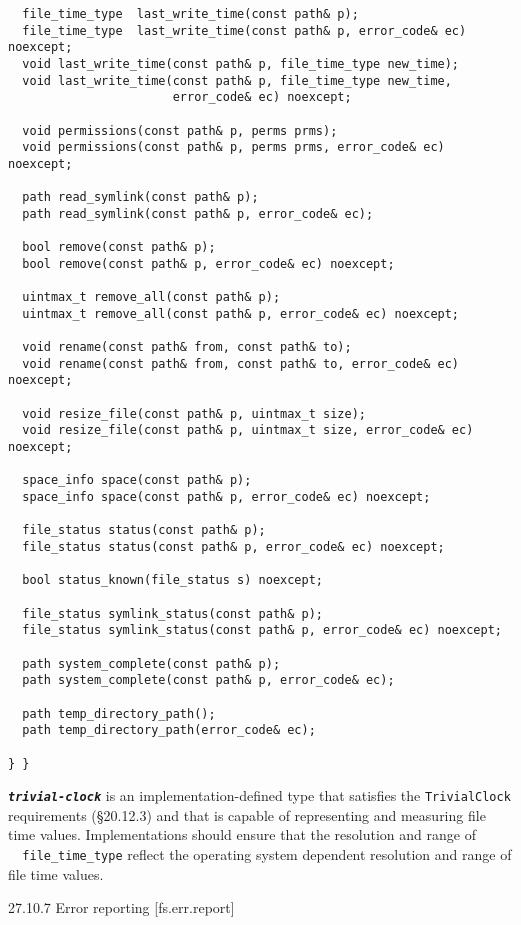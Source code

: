 \begin{verbatim}
  file_time_type  last_write_time(const path& p);
  file_time_type  last_write_time(const path& p, error_code& ec) noexcept;
  void last_write_time(const path& p, file_time_type new_time);
  void last_write_time(const path& p, file_time_type new_time,
                       error_code& ec) noexcept;
                       
  void permissions(const path& p, perms prms);
  void permissions(const path& p, perms prms, error_code& ec) noexcept;

  path read_symlink(const path& p);
  path read_symlink(const path& p, error_code& ec);

  bool remove(const path& p);
  bool remove(const path& p, error_code& ec) noexcept;

  uintmax_t remove_all(const path& p);
  uintmax_t remove_all(const path& p, error_code& ec) noexcept;

  void rename(const path& from, const path& to);
  void rename(const path& from, const path& to, error_code& ec) noexcept;

  void resize_file(const path& p, uintmax_t size);
  void resize_file(const path& p, uintmax_t size, error_code& ec) noexcept;

  space_info space(const path& p);
  space_info space(const path& p, error_code& ec) noexcept;

  file_status status(const path& p);
  file_status status(const path& p, error_code& ec) noexcept;

  bool status_known(file_status s) noexcept;

  file_status symlink_status(const path& p);
  file_status symlink_status(const path& p, error_code& ec) noexcept;

  path system_complete(const path& p);
  path system_complete(const path& p, error_code& ec);

  path temp_directory_path();
  path temp_directory_path(error_code& ec);

} }
\end{verbatim}

\textbf{\emph{\texttt{trivial-clock}}} is an implementation-defined type
that satisfies the \texttt{TrivialClock} requirements (§20.12.3) and
that is capable of representing and measuring file time values.
Implementations should ensure that the resolution and range of
\texttt{\ \ file\_time\_type} reflect the operating system dependent
resolution and range of file time values.

27.10.7 Error reporting {[}fs.err.report{]}

